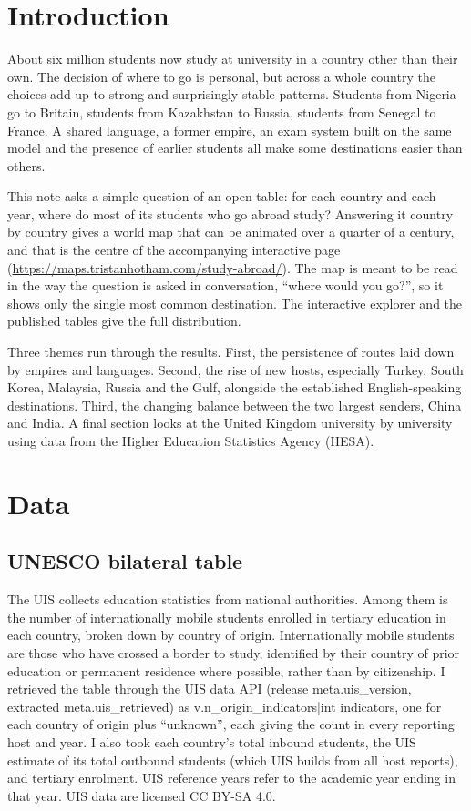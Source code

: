 \documentclass[11pt,a4paper]{article}
\begin{document}
\section{Introduction}

About six million students now study at university in a country other than their own. The decision of where to go is personal, but across a whole country the choices add up to strong and surprisingly stable patterns. Students from Nigeria go to Britain, students from Kazakhstan to Russia, students from Senegal to France. A shared language, a former empire, an exam system built on the same model and the presence of earlier students all make some destinations easier than others.

This note asks a simple question of an open table: for each country and each year, where do most of its students who go abroad study? Answering it country by country gives a world map that can be animated over a quarter of a century, and that is the centre of the accompanying interactive page (\url{https://maps.tristanhotham.com/study-abroad/}). The map is meant to be read in the way the question is asked in conversation, ``where would you go?'', so it shows only the single most common destination. The interactive explorer and the published tables give the full distribution.

Three themes run through the results. First, the persistence of routes laid down by empires and languages. Second, the rise of new hosts, especially Turkey, South Korea, Malaysia, Russia and the Gulf, alongside the established English-speaking destinations. Third, the changing balance between the two largest senders, China and India. A final section looks at the United Kingdom university by university using data from the Higher Education Statistics Agency (HESA).

\section{Data}

\subsection{UNESCO bilateral table}

The UIS collects education statistics from national authorities. Among them is the number of internationally mobile students enrolled in tertiary education in each country, broken down by country of origin. Internationally mobile students are those who have crossed a border to study, identified by their country of prior education or permanent residence where possible, rather than by citizenship. I retrieved the table through the UIS data API (release {{meta.uis_version}}, extracted {{meta.uis_retrieved}}) as {{v.n_origin_indicators|int}} indicators, one for each country of origin plus ``unknown'', each giving the count in every reporting host and year. I also took each country's total inbound students, the UIS estimate of its total outbound students (which UIS builds from all host reports), and tertiary enrolment. UIS reference years refer to the academic year ending in that year. UIS data are licensed CC BY-SA 4.0.
\end{document}
